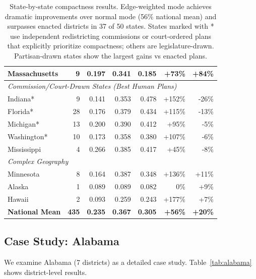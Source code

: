 \begin{table}[t]
\begin{tabular}{lrrrrrr}
Massachusetts & 9 & 0.197 & 0.341 & 0.185 & +73\% & \textbf{+84\%} \\
\midrule
\multicolumn{7}{l}{\textit{Commission/Court-Drawn States (Best Human Plans)}} \\
Indiana* & 9 & 0.141 & 0.353 & 0.478 & +152\% & -26\% \\
Florida* & 28 & 0.176 & 0.379 & 0.434 & +115\% & -13\% \\
Michigan* & 13 & 0.200 & 0.390 & 0.412 & +95\% & -5\% \\
Washington* & 10 & 0.173 & 0.358 & 0.380 & +107\% & -6\% \\
Mississippi & 4 & 0.266 & 0.385 & 0.417 & +45\% & -8\% \\
\midrule
\multicolumn{7}{l}{\textit{Complex Geography}} \\
Minnesota & 8 & 0.164 & 0.387 & 0.348 & +136\% & +11\% \\
Alaska & 1 & 0.089 & 0.089 & 0.082 & 0\% & +9\% \\
Hawaii & 2 & 0.093 & 0.259 & 0.243 & +177\% & +7\% \\
\midrule
\textbf{National Mean} & \textbf{435} & \textbf{0.235} & \textbf{0.367} & \textbf{0.305} & \textbf{+56\%} & \textbf{+20\%} \\
\bottomrule
\end{tabular}
\caption{State-by-state compactness results. Edge-weighted mode achieves dramatic improvements over normal mode (56\% national mean) and surpasses enacted districts in 37 of 50 states. States marked with * use independent redistricting commissions or court-ordered plans that explicitly prioritize compactness; others are legislature-drawn. Partisan-drawn states show the largest gains vs enacted plans.}
\label{tab:state-results}
\end{table}

\subsection{Case Study: Alabama}

We examine Alabama (7 districts) as a detailed case study. Table~\ref{tab:alabama} shows district-level results.

